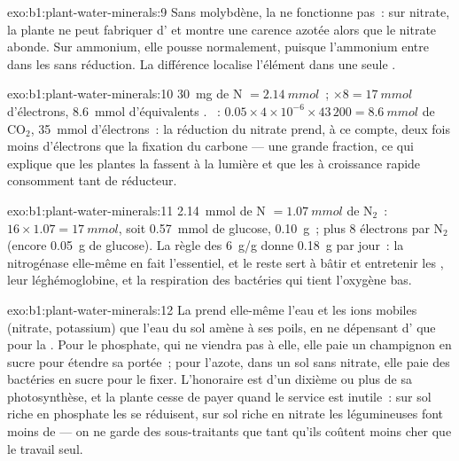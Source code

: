 \begin{solution}{exo:b1:plant-water-minerals:9}
Sans molybdène, la  ne fonctionne pas~: sur nitrate,
la plante ne peut fabriquer d' et montre une carence
azotée alors que le nitrate abonde. Sur ammonium, elle pousse
normalement, puisque l'ammonium entre dans les  sans
réduction. La différence localise l'élément dans une seule .
\end{solution}

\begin{solution}{exo:b1:plant-water-minerals:10}
\qty{30}{mg} de N $= \qty{2.14}{mmol}$~; $\times 8 = \qty{17}{mmol}$
d'électrons, \qty{8.6}{mmol} d'équivalents . ~: $0.05\times
4\times 10^{-6}\times 43\,200 = \qty{8.6}{mmol}$ de $\mathrm{CO_2}$,
\qty{35}{mmol} d'électrons~: la réduction du nitrate prend, à ce compte,
deux fois moins d'électrons que la fixation du carbone --- une grande
fraction, ce qui explique que les plantes la fassent à la lumière et
que les  à croissance rapide consomment tant de réducteur.
\end{solution}

\begin{solution}{exo:b1:plant-water-minerals:11}
\qty{2.14}{mmol} de N $= \qty{1.07}{mmol}$ de $\mathrm{N_2}$~: 
$16\times 1.07 = \qty{17}{mmol}$, soit \qty{0.57}{mmol} de glucose,
\qty{0.10}{g}~; plus 8 électrons par $\mathrm{N_2}$ (encore
\qty{0.05}{g} de glucose). La règle des \qty{6}{g/g} donne
\qty{0.18}{g} par jour~: la nitrogénase elle-même en fait l'essentiel,
et le reste sert à bâtir et entretenir les , leur
léghémoglobine, et la respiration des bactéries qui tient l'oxygène bas.
\end{solution}

\begin{solution}{exo:b1:plant-water-minerals:12}
La  prend elle-même l'eau et les ions mobiles (nitrate,
potassium) que l'eau du sol amène à ses poils, en ne dépensant d'
que pour la . Pour le phosphate, qui ne viendra pas à
elle, elle paie un champignon en sucre pour étendre sa portée~; pour
l'azote, dans un sol sans nitrate, elle paie des bactéries en sucre
pour le fixer. L'honoraire est d'un dixième ou plus de sa
photosynthèse, et la plante cesse de payer quand le service est inutile~:
sur sol riche en phosphate les  se réduisent, sur sol riche
en nitrate les légumineuses font moins de  --- on ne garde des
sous-traitants que tant qu'ils coûtent moins cher que le travail seul.
\end{solution}

